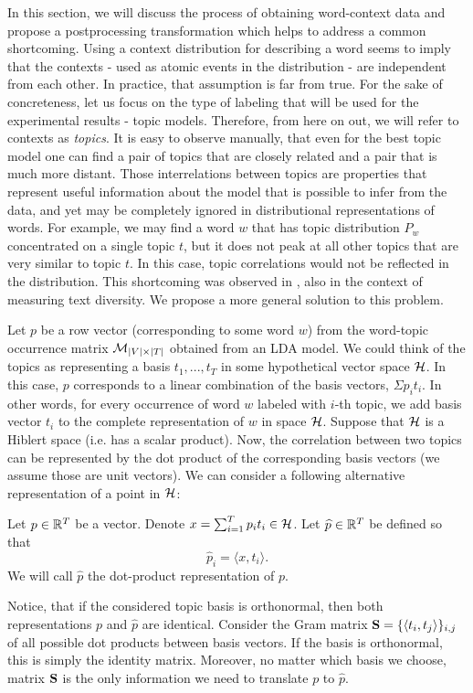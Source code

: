 In this section, we will discuss the process of obtaining word-context
data and propose a postprocessing transformation which helps to
address a common shortcoming. Using a context distribution for
describing a word seems to imply that the
contexts - used as atomic events in the distribution - are independent
from each other. In practice, that assumption is far from true. For
the sake of concreteness, let us focus on the type of labeling that will be used for
the experimental results - topic models. Therefore, from here on out, we will
refer to contexts as {\em topics}. It is easy to observe
manually, that even for the best topic model one can find a pair of
topics that are closely related and a pair that is much more
distant. Those interrelations between topics are 
properties that represent useful information about the model that is
possible to infer from the data, and yet
may be completely ignored in distributional representations of words. 
For example, we may find a word $w$ that has topic distribution $P_w$
concentrated on a single topic $t$, but it does 
not peak at all other topics that are very similar to
topic $t$. In this case, topic correlations would not be reflected in
the distribution. This shortcoming was observed in \cite{bache:2013},
also in the context of measuring text diversity. We propose a more
general solution to this problem.

Let $p$ be a row vector (corresponding to some word $w$)  from the
word-topic occurrence matrix ${\mathcal M}_{|V|\times|T|}$ obtained from an LDA
model. We could think of the topics as representing a basis
$t_1,...,t_T$ in some hypothetical vector space ${\mathcal H}$. In 
this case, $p$ corresponds to a linear combination of the basis
vectors, $\Sigma p_i t_i$. In other words, for every occurrence of
word $w$ labeled with $i$-th topic, we add basis vector $t_i$ to the
complete representation of $w$ in space ${\mathcal H}$.
Suppose that ${\mathcal H}$ is a Hiblert space (i.e. has a scalar
product). Now, the correlation between two topics can be represented
by the dot product of the corresponding basis vectors (we assume those
are unit vectors). We can consider a following alternative representation
of a point in ${\mathcal H}$:

\bed
Let $p\in{\mathbb R}^T$ be a vector. Denote $x=\sum_{i=1}^T p_i
t_i\in{\mathcal H}$. Let $\widehat{p}\in{\mathbb R}^T$ be defined so that
\[\widehat{p}_i = \langle x,t_i\rangle.\]
We will call $\widehat{p}$ the dot-product representation of $p$.
\eed

Notice, that if the considered topic basis is orthonormal, then both
representations $p$ and $\widehat{p}$ are identical. Consider the Gram matrix
$\operatorname{\mathbf{S}}=\{\langle t_i,t_j\rangle\}_{i,j}$ of all possible dot products between
basis vectors. If the basis is orthonormal, this is simply the identity
matrix. Moreover, no matter which basis we choose, matrix $\operatorname{\mathbf{S}}$ is the
only information we need to translate $p$ to $\widehat{p}$.

